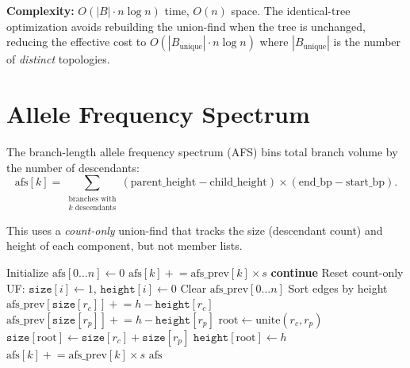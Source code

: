 \documentclass[11pt]{article}
\begin{document}
\textbf{Complexity:} $O(|B| \cdot n \log n)$ time, $O(n)$ space.  The
identical-tree optimization avoids rebuilding the union-find when the tree
is unchanged, reducing the effective cost to $O(|B_\text{unique}| \cdot n
\log n)$ where $|B_\text{unique}|$ is the number of \emph{distinct}
topologies.

\section{Allele Frequency Spectrum}

The branch-length allele frequency spectrum (AFS) bins total branch volume
by the number of descendants:
\[
\text{afs}[k] = \sum_{\substack{\text{branches with} \\ k \text{ descendants}}}
    (\text{parent\_height} - \text{child\_height})
    \times (\text{end\_bp} - \text{start\_bp}).
\]

This uses a \emph{count-only} union-find that tracks the size (descendant
count) and height of each component, but not member lists.

\begin{algorithm}[h]
\caption{\texttt{allele\_frequency\_spectrum}: Branch-length AFS}
\begin{algorithmic}[1]
\State Initialize $\text{afs}[0 \ldots n] \gets 0$
\For{each interval $[b_j, b_{j+1})$ with span $s$}
            \State $\text{afs}[k] \mathrel{+}= \text{afs\_prev}[k] \times s$
        \EndFor
        \State \textbf{continue}
    \EndIf
    \State Reset count-only UF: $\texttt{size}[i] \gets 1$, $\texttt{height}[i] \gets 0$
    \State Clear $\text{afs\_prev}[0 \ldots n]$
    \State Sort edges by height
            \State $\text{afs\_prev}[\texttt{size}[r_c]] \mathrel{+}= h - \texttt{height}[r_c]$
        \EndIf
            \State $\text{afs\_prev}[\texttt{size}[r_p]] \mathrel{+}= h - \texttt{height}[r_p]$
        \EndIf
        \State $\text{root} \gets \text{unite}(r_c, r_p)$
        \State $\texttt{size}[\text{root}] \gets \texttt{size}[r_c] + \texttt{size}[r_p]$
        \State $\texttt{height}[\text{root}] \gets h$
    \EndFor
        \State $\text{afs}[k] \mathrel{+}= \text{afs\_prev}[k] \times s$
    \EndFor
\EndFor
\State \Return $\text{afs}$
\end{algorithmic}
\end{algorithm}
\end{document}
